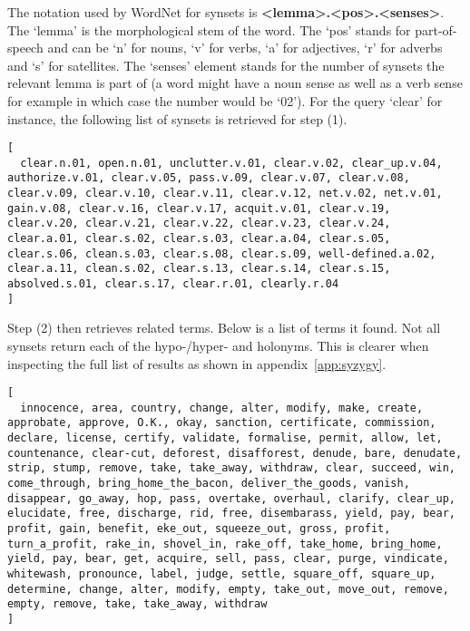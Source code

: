 The notation used by WordNet for synsets is \textbf{<lemma>.<pos>.<senses>}. The `lemma' is the morphological stem of the word. The `pos' stands for part-of-speech and can be `n' for nouns, `v' for verbs, `a'
for adjectives, `r' for adverbs and `s' for satellites. The `senses' element stands for the number of synsets the relevant lemma is part of (a word might have a noun sense as well as a verb sense for example in which case the number would be `02'). For the query `clear' for instance, the following list of synsets is retrieved for step (1).

\begin{verbatim}
[
  clear.n.01, open.n.01, unclutter.v.01, clear.v.02, clear_up.v.04, authorize.v.01, clear.v.05, pass.v.09, clear.v.07, clear.v.08, clear.v.09, clear.v.10, clear.v.11, clear.v.12, net.v.02, net.v.01, gain.v.08, clear.v.16, clear.v.17, acquit.v.01, clear.v.19, clear.v.20, clear.v.21, clear.v.22, clear.v.23, clear.v.24, clear.a.01, clear.s.02, clear.s.03, clear.a.04, clear.s.05, clear.s.06, clean.s.03, clear.s.08, clear.s.09, well-defined.a.02, clear.a.11, clean.s.02, clear.s.13, clear.s.14, clear.s.15, absolved.s.01, clear.s.17, clear.r.01, clearly.r.04
]
\end{verbatim}

Step (2) then retrieves related terms. Below is a list of terms it found. Not all synsets return each of the hypo-/hyper- and holonyms. This is clearer when inspecting the full list of results as shown in appendix~\ref{app:syzygy}. 

\begin{verbatim}
[
  innocence, area, country, change, alter, modify, make, create, approbate, approve, O.K., okay, sanction, certificate, commission, declare, license, certify, validate, formalise, permit, allow, let, countenance, clear-cut, deforest, disafforest, denude, bare, denudate, strip, stump, remove, take, take_away, withdraw, clear, succeed, win, come_through, bring_home_the_bacon, deliver_the_goods, vanish, disappear, go_away, hop, pass, overtake, overhaul, clarify, clear_up, elucidate, free, discharge, rid, free, disembarass, yield, pay, bear, profit, gain, benefit, eke_out, squeeze_out, gross, profit, turn_a_profit, rake_in, shovel_in, rake_off, take_home, bring_home, yield, pay, bear, get, acquire, sell, pass, clear, purge, vindicate, whitewash, pronounce, label, judge, settle, square_off, square_up, determine, change, alter, modify, empty, take_out, move_out, remove, empty, remove, take, take_away, withdraw
]
\end{verbatim}

